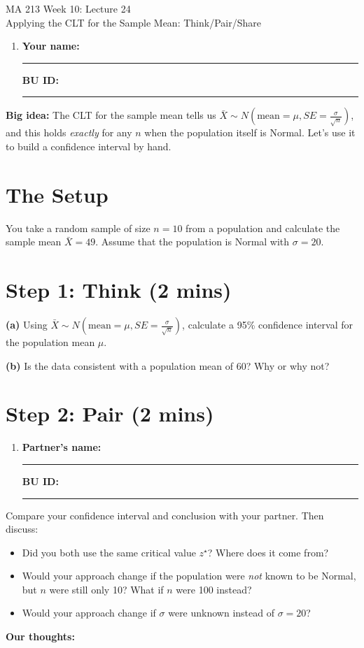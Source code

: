 \documentclass{article}
\newcommand{\coursenumber}{MA 213}
\newcommand{\weekplaceholder}{10}
\newcommand{\lectureplaceholder}{24}
\newcommand{\lecturetitle}{Applying the CLT for the Sample Mean: Think/Pair/Share}
\newcommand{\nameblank}{\rule{1.75in}{0.4pt}}
\newcommand{\idblank}{\rule{1.55in}{0.4pt}}
\begin{document}
\begin{center}
  {\LARGE \coursenumber{} Week \weekplaceholder{}: Lecture \lectureplaceholder{}}\\
  {\large \lecturetitle{}}
\end{center}

\begin{enumerate}[label=\arabic*.,leftmargin=*,itemsep=.7em]
  \item \textbf{Your name:} \nameblank \hfill \textbf{BU ID:} \idblank
\end{enumerate}

\textbf{Big idea:} The CLT for the sample mean tells us $\bar{X} \sim N\left(\text{mean}=\mu, SE = \frac{\sigma}{\sqrt{n}}\right)$, and this holds \emph{exactly} for any $n$ when the population itself is Normal. Let's use it to build a confidence interval by hand.

\section*{The Setup}

You take a random sample of size $n = 10$ from a population and calculate the sample mean $\bar{X} = 49$. Assume that the population is Normal with $\sigma = 20$.

\section*{Step 1: Think (2 mins)}

\textbf{(a)} Using $\bar{X} \sim N\left(\text{mean}=\mu, SE = \frac{\sigma}{\sqrt{n}}\right)$, calculate a 95\% confidence interval for the population mean $\mu$.
\vspace{1.1in}

\textbf{(b)} Is the data consistent with a population mean of 60? Why or why not?
\vspace{0.6in}

\newpage
\section*{Step 2: Pair (2 mins)}

\begin{enumerate}[label=\arabic*.,leftmargin=*,itemsep=.7em, start=2]
  \item \textbf{Partner's name:} \nameblank \hfill \textbf{BU ID:} \idblank
\end{enumerate}

Compare your confidence interval and conclusion with your partner. Then discuss:

\begin{itemize}
  \item Did you both use the same critical value $z^\star$? Where does it come from?
  \item Would your approach change if the population were \emph{not} known to be Normal, but $n$ were still only 10? What if $n$ were 100 instead?
  \item Would your approach change if $\sigma$ were unknown instead of $\sigma = 20$?
\end{itemize}

\textbf{Our thoughts:}
\vfill
\end{document}
